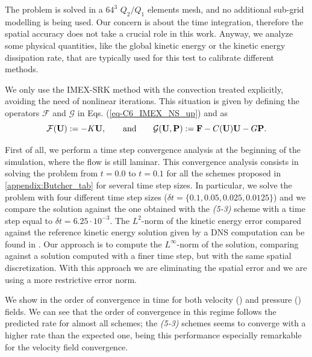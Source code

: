 The problem is solved in a $64^3$ $Q_2/Q_1$ elements mesh, and no additional sub-grid modelling is being used. Our concern is about the time integration, therefore the spatial accuracy does not take a crucial role in this work. Anyway, we analyze some physical quantities, like the global kinetic energy or the kinetic energy dissipation rate, that are typically used for this test to calibrate different methods.

We only use the IMEX-SRK method with the convection treated explicitly, avoiding the need of nonlinear iterations. This situation is given by defining the operators $\mathcal{F}$ and $\mathcal{G}$ in  Eqs. (\ref{eq-C6_IMEX_NS_up}) and  as
$$\mathcal{F}({\bf U}):=-K{\bf U},\quad\quad\mbox{and}\quad\quad\mathcal{G}({\bf U},{\bf P}):={\bf F}-C({\bf U}){\bf U}-G{\bf P}.$$

First of all, we perform a time step convergence analysis at the beginning of the simulation, where the flow is still laminar. This convergence analysis consists in solving the problem from $t=0.0$ to $t=0.1$ for all the schemes proposed in \ref{appendix:Butcher_tab} for several time step sizes. In particular, we solve the problem with four different time step sizes ($\delta t=\{0.1,0.05,0.025,0.0125\}$) and we compare the solution against the one obtained with the \textit{(5-3)} scheme with a time step equal to $\delta t=6.25\cdot10^{-3}$. The $L^2$-norm of the kinetic energy error compared against the reference kinetic energy solution given by a DNS computation can be found in  \cite{boom_time-accurate_????}. Our approach is to compute the $L^{\infty}$-norm of the solution, comparing against a solution computed with a finer time step, but with the same spatial discretization. With this approach we are eliminating the spatial error and we are using a more restrictive error norm.

We show in  the order of convergence in time for both velocity () and pressure () fields. We can see that the order of convergence in this regime follows the predicted rate for almost all schemes; the \textit{(5-3)} schemes seems to converge with a higher rate than the expected one, being this performance especially remarkable for the velocity field convergence.

